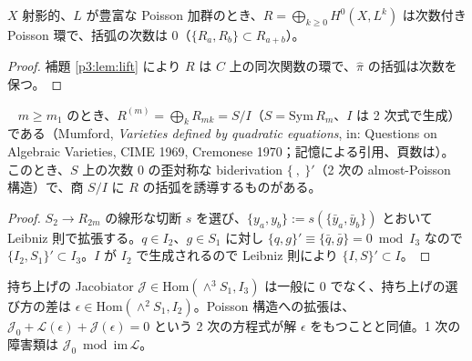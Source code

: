\begin{prop}\tP\label{p3:prop:graded}
$X$ 射影的、$L$ が豊富な Poisson 加群のとき、$R=\bigoplus_{k\ge0}H^0(X,L^k)$ は次数付き Poisson 環で、括弧の次数は 0（$\{R_a,R_b\}\subset R_{a+b}$）。
\end{prop}
\begin{proof}
補題 \ref{p3:lem:lift} により $R$ は $C$ 上の同次関数の環で、$\hat\pi$ の括弧は次数を保つ。\qedhere
\end{proof}
\begin{prop}\tP\ \tC\label{p3:prop:almost}
$m\ge m_1$ のとき、$R^{(m)}=\bigoplus_kR_{mk}=S/I$（$S=\mathrm{Sym}\,R_m$、$I$ は 2 次式で生成）である（Mumford, \emph{Varieties defined by quadratic equations}, in: Questions on Algebraic Varieties, CIME 1969, Cremonese 1970；記憶による引用、頁数は\tQ）。このとき、$S$ 上の次数 0 の歪対称な biderivation $\{\ ,\ \}'$（2 次の almost-Poisson 構造）で、商 $S/I$ に $R$ の括弧を誘導するものがある。
\end{prop}
\begin{proof}
$S_2\to R_{2m}$ の線形な切断 $s$ を選び、$\{y_a,y_b\}:=s(\{\bar y_a,\bar y_b\})$ とおいて Leibniz 則で拡張する。$q\in I_2$、$g\in S_1$ に対し $\{q,g\}'\equiv\{\bar q,\bar g\}=0\bmod I_3$ なので $\{I_2,S_1\}'\subset I_3$。$I$ が $I_2$ で生成されるので Leibniz 則により $\{I,S\}'\subset I$。\qedhere
\end{proof}
\noindent 持ち上げの Jacobiator $\mathcal J\in\mathrm{Hom}(\wedge^3S_1,I_3)$ は一般に 0 でなく、持ち上げの選び方の差は $\epsilon\in\mathrm{Hom}(\wedge^2S_1,I_2)$。Poisson 構造への拡張は、$\mathcal J_0+\mathcal L(\epsilon)+\mathcal J(\epsilon)=0$ という 2 次の方程式が解 $\epsilon$ をもつことと同値。1 次の障害類は $\mathcal J_0\bmod\mathrm{im}\,\mathcal L$。

